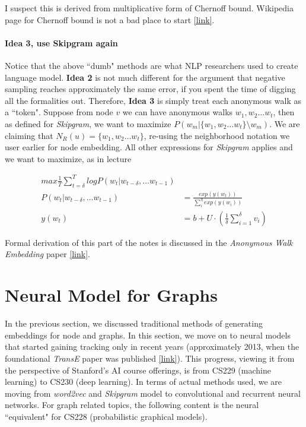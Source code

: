 \begin{todo}
    I suspect this is derived from multiplicative form of Chernoff bound. Wikipedia page for Chernoff bound is not a bad place to start \href{https://en.wikipedia.org/wiki/Chernoff_bound}{[link]}.
\end{todo}{}

\paragraph{Idea 3, use Skipgram again} Notice that the above ``dumb" methods are what NLP researchers used to create language model. \textbf{Idea 2} is not much different for the argument that negative sampling reaches approximately the same error, if you spent the time of digging all the formalities out. Therefore, \textbf{Idea 3} is simply treat each anonymous walk as a ``token". Suppose from node $v$ we can have anonymous walks $w_1, w_2 \dots w_t$, then as defined for \textit{Skipgram}, we want to maximize $P(w_m | \{w_1, w_2 \dots w_t\} \setminus w_m)$. We are claiming that $N_R(u) = \{w_1, w_2 \dots w_t\}$, re-using the neighborhood notation we user earlier for node embedding. All other expressions for \textit{Skipgram} applies and we want to maximize, as in lecture

\begin{align}
    max \frac{1}{T}\sum_{t=\delta}^{T}log P(w_t|w_{t-\delta}, \dots w_{t-1})\\
    P(w_t|w_{t-\delta}, \dots w_{t-1}) &= \frac{exp(y(w_t))}{\sum_i^{\eta} exp(y(w_i))} \\
    y(w_t) &= b + U \cdot (\frac{1}{\delta}\sum_{i=1}^{\delta}v_i)
\end{align}{}

Formal derivation of this part of the notes is discussed in the \textit{Anonymous Walk Embedding} paper \href{https://arxiv.org/pdf/1805.11921.pdf}{[link]}.


\section{Neural Model for Graphs}

In the previous section, we discussed traditional methods of generating embeddings for node and graphs. In this section, we move on to neural models that started gaining tracking only in recent years (approximately 2013, when the foundational \textit{TransE} paper was published \href{https://papers.nips.cc/paper/5071-translating-embeddings-for-modeling-multi-relational-data.pdf}{[link]}). This progress, viewing it from the perspective of Stanford's AI course offerings, is from CS229 (machine learning) to CS230 (deep learning). In terms of actual methods used, we are moving from \textit{word2vec} and \textit{Skipgram} model to convolutional and recurrent neural networks. For graph related topics, the following content is the neural ``equivalent" for CS228 (probabilistic graphical models).

